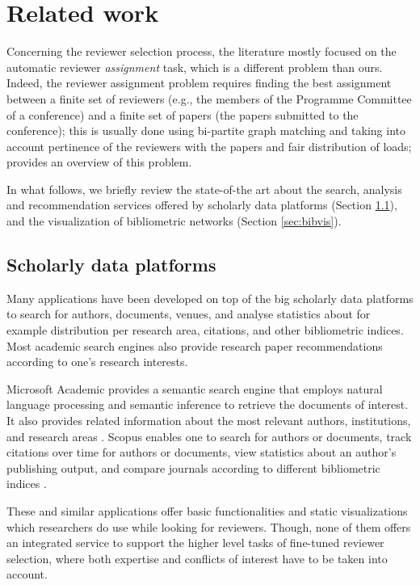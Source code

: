 \chapter{Related work}
\label{sec:related}

Concerning the reviewer selection process, the literature mostly focused on the automatic reviewer \emph{assignment} task, which is a different problem than ours. Indeed, the reviewer assignment problem requires finding the best assignment between a finite set of reviewers (e.g., the members of the Programme Committee of a conference) and a finite set of papers (the papers submitted to the conference); this is usually done using bi-partite graph matching and taking into account pertinence of the reviewers with the papers and fair distribution of loads; \cite{WaCh10} provides an overview of this problem. 

In what follows, we briefly review the state-of-the art about the search, analysis and recommendation services offered by scholarly data platforms (Section \ref{sec:schoplat}), and the visualization of bibliometric networks (Section \ref{sec:bibvis}). 

\section{Scholarly data platforms}
\label{sec:schoplat}
Many applications have been developed on top of the big scholarly data platforms to search for authors, documents, venues, and analyse statistics about for example distribution per research area, citations, and other bibliometric indices. Most academic search engines also provide research paper recommendations according to one's research interests. 

Microsoft Academic provides a semantic search engine that employs natural language processing and semantic inference to retrieve the documents of interest. It also provides related information about the most relevant authors, institutions, and research areas \cite{SiZh15}. Scopus enables one to search for authors or documents,  track citations over time for authors or documents, view statistics about an author's publishing output, and compare journals according to different bibliometric indices \cite{scopus}. 

These and similar applications offer basic functionalities and static visualizations which researchers do use while looking for reviewers. Though, none of them offers an integrated service to support the higher level tasks of fine-tuned reviewer selection, where both expertise and conflicts of interest have to be taken into account. 

